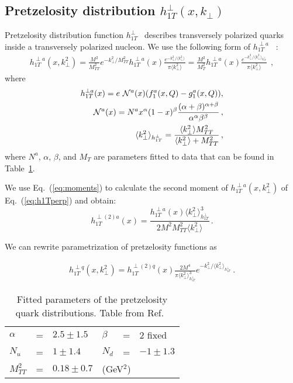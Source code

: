 \documentclass[a4paper,11pt]{article}
\newcommand{\be}{\begin{equation}}
\newcommand{\ee}{\end{equation}}
\newcommand{\ba}{\begin{eqnarray}}
\newcommand{\ea}{\end{eqnarray}}
\newcommand{\la}{\langle}
\newcommand{\ra}{\rangle}
\def\kperp{k_\perp}
\def\avkperp{\la \kperp^2 \ra}
\begin{document}
\subsection{\boldmath Pretzelosity distribution $h_{1T}^{\perp}(x,k_\perp)$}
\label{App:basis-h1Tperp}

Pretzelosity   distribution function   
$h_{1T}^{\perp}$~\cite{Lefky:2014eia} describes transversely polarized quarks 
inside a transversely polarized nucleon.
We use the following form of $h_{1T}^{\perp a}$ ~\cite{Lefky:2014eia}:
\ba
h_{1T}^{\perp a}(x,k_{\perp}^2) = \frac{M^2}{M_{TT}^2} e^{-\kperp^2/M_{TT}^2} h^{\perp a}_{1T}(x) \frac{e^{-{\kperp^2}/{\avkperp}}}{\pi \avkperp}=\frac{M^2}{M_T^2} h^{\perp a}_{1T}(x) \frac{e^{-{\kperp^2}/{\avkperp_{h_{1T}^\perp}}}}{\pi \avkperp}\,\;,
\label{eq:h1Tperp}
\ea
where
\ba
h^{\perp a}_{1T}(x) = e  \ {\cal N}^a(x) (f_{1}^{a}(x, Q) - g_{1}^{a}(x, Q)), \label{eq:hx_par}\\
{\cal N}^a(x) = N^{a} x^{\alpha} (1-x)^{\beta} \frac{(\alpha + \beta)^{\alpha + \beta}}{\alpha^{\alpha} \beta^{\beta}}\, ,  \\
\avkperp_{h_{1T}^\perp}  = \frac{\avkperp M_{TT}^2}{\avkperp + M_{TT}^2}\, ,
\ea
where ${N}^a$, $\alpha$, $\beta$, and $M_T$ are parameters fitted to data that can be found in Table~\ref{fitparI}.

  We use Eq.~(\ref{eq:moments}) to calculate the second moment of $ h_{1T}^{\perp a}(x,\kperp^2)$
of Eq.~(\ref{eq:h1Tperp}) and obtain:
\be
h_{1T}^{\perp (2) a}(x) =  \frac{h^{\perp a}_{1T}(x) \avkperp_{h_{1T}^\perp}^3}{2 M^2 M_{TT}^2 \avkperp} \, .
\ee

We can rewrite parametrization of pretzelosity   functions as

\ba
h_{1T}^{\perp q}(x,\kperp^2) =  h_{1T}^{\perp (2) q}(x)   \frac{2 M^4}{\pi \avkperp_{h_{1T}^\perp}^3} e^{-\kperp^2/{\avkperp_{h_{1T}^\perp}}}
\label{pretzelosity_new} \ .
\ea

%
\begin{table}[htb]
\centering
\begin{tabular}{l c l l c l}
\hline
$\alpha$ &=& $2.5\pm1.5$ & $\beta$ &=& $2$ fixed \\
 $N_{u}$ &=& $1 \pm 1.4$ & $N_{d}$ &=& $-1 \pm 1.3$\\
 $M_{TT}^2$ &=& $0.18 \pm  0.7$&\multicolumn{3}{l}{(GeV$^2$)}\\ 
\hline
\end{tabular}
\caption{Fitted parameters of the pretzelosity quark distributions. Table from Ref.~\cite{Lefky:2014eia}}
\label{fitparI}
\end{table}
%
 
\end{document}
